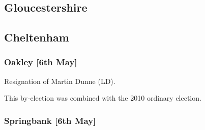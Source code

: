 \begin{resultsiii}
\section{Gloucestershire}

%
%
%
%

\subsection{Cheltenham}

\subsubsection*{Oakley \hspace*{\fill}\nolinebreak[1]%
\enspace\hspace*{\fill}
[6th May]}


Resignation of Martin Dunne (LD).

This by-election was combined with the 2010 ordinary election.

\subsubsection*{Springbank \hspace*{\fill}\nolinebreak[1]%
\enspace\hspace*{\fill}
[6th May]}



\end{resultsiii}

